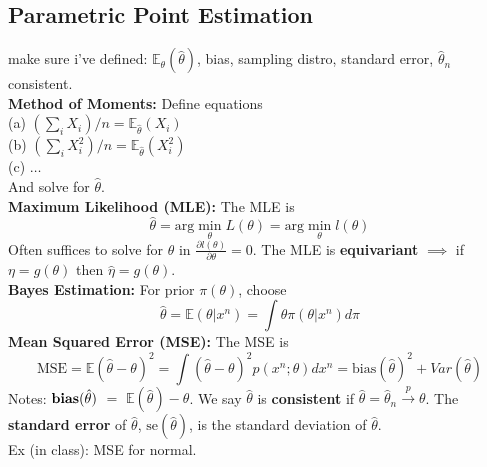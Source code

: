 \documentclass[10pt,twocolumn]{article}
\begin{document}
\subsection*{Parametric Point Estimation}
make sure i've defined: $\mathbb{E}_{\theta}(\hat{\theta})$, bias, sampling distro, standard error, $\hat{\theta}_{n}$ consistent.\\
\textbf{Method of Moments:} Define equations\\
(a) \hspace{3mm} $(\sum_{i} X_{i})/n = \mathbb{E}_{\hat{\theta}}(X_{i})$\\
(b) \hspace{3mm} $(\sum_{i} X_{i}^{2})/n = \mathbb{E}_{\hat{\theta}}(X_{i}^{2})$\\
(c) \hspace{3mm} $\ldots$ \\
And solve for $\hat{\theta}$.\\
\textbf{Maximum Likelihood (MLE):} The MLE is
\begin{equation}
\hat{\theta} = \text{arg}\min_{\theta} L(\theta) = \text{arg}\min_{\theta} l(\theta)
\end{equation}
Often suffices to solve for $\theta$ in $\frac{\partial l(\theta)}{\partial \theta} = 0$.
The MLE is \textbf{equivariant} $\implies$ if $\eta = g(\theta)$ then $\hat{\eta} = g(\theta)$. \\
\textbf{Bayes Estimation:} For prior $\pi(\theta)$, choose 
\begin{equation}
    \hat{\theta} = \mathbb{E}(\theta|x^{n}) = \int \theta \pi(\theta|x^{n}) d\pi
\end{equation}
\textbf{Mean Squared Error (MSE):} The MSE is
\begin{equation}
    \text{MSE} = \mathbb{E}(\hat{\theta} - \theta)^{2} = \int (\hat{\theta}-\theta)^{2} p(x^{n};\theta)dx^{n} = \text{bias}({\hat{\theta}})^{2} + Var(\hat{\theta})
\end{equation}
Notes: $\text{\textbf{bias}}(\hat{\theta})$ $=$ $\mathbb{E}(\hat{\theta}) - \theta$. We say $\hat{\theta}$ is \textbf{consistent} if $\hat{\theta} = \hat{\theta}_{n} \xrightarrow{p} \theta$. The \textbf{standard error} of $\hat{\theta}$, $\text{se}(\hat{\theta})$, is the standard deviation of $\hat{\theta}$.\\
Ex (in class): MSE for normal.
\end{document}
